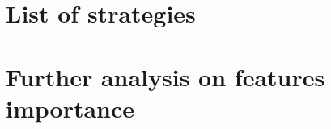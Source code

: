 \documentclass[11pt, twoside, a4paper]{book}
\theoremstyle{definition}
\begin{document}

\restoregeometry

\frontmatter
\pagestyle{chapterstyle} %




\tableofcontents
\listoffigures
\listoftables
\listofalgorithms

\mainmatter
\pagestyle{normal} %
















\begin{appendices}


\chapter{List of strategies}




\chapter{Further analysis on features importance}



\end{appendices}
\end{document}
